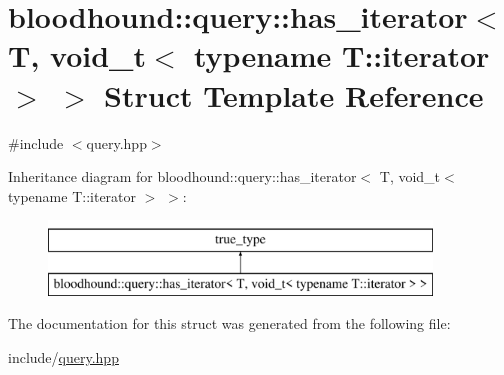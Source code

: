 \hypertarget{structbloodhound_1_1query_1_1has__iterator_3_01T_00_01void__t_3_01typename_01T_1_1iterator_01_4_01_4}{}\section{bloodhound\+:\+:query\+:\+:has\+\_\+iterator$<$ T, void\+\_\+t$<$ typename T\+:\+:iterator $>$ $>$ Struct Template Reference}
\label{structbloodhound_1_1query_1_1has__iterator_3_01T_00_01void__t_3_01typename_01T_1_1iterator_01_4_01_4}


{\ttfamily \#include $<$query.\+hpp$>$}

Inheritance diagram for bloodhound\+:\+:query\+:\+:has\+\_\+iterator$<$ T, void\+\_\+t$<$ typename T\+:\+:iterator $>$ $>$\+:\begin{figure}[H]
\begin{center}
\leavevmode
\includegraphics[height=2.000000cm]{structbloodhound_1_1query_1_1has__iterator_3_01T_00_01void__t_3_01typename_01T_1_1iterator_01_4_01_4}
\end{center}
\end{figure}


The documentation for this struct was generated from the following file\+:\begin{DoxyCompactItemize}
\item 
include/\hyperlink{query_8hpp}{query.\+hpp}\end{DoxyCompactItemize}
